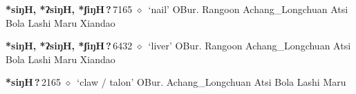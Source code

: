   \begin{list}{}{\leftmargin=1.5em \itemindent=-1.5em}
  \item {\footnotesize \textbf{*siŋH, *ʔsiŋH, *ʃiŋH\,?\,}}{\tiny 7165}
         $\diamond$~`nail'
         OBur. 
\hspace{1ex}
         Rangoon 
\hspace{1ex}
         Achang\_Longchuan 
\hspace{1ex}
         Atsi 
\hspace{1ex}
         Bola 
\hspace{1ex}
         Lashi 
\hspace{1ex}
         Maru 
\hspace{1ex}
         Xiandao 
  \item {\footnotesize \textbf{*siŋH, *ʔsiŋH, *ʃiŋH\,?\,}}{\tiny 6432}
\hspace{1ex}
         $\diamond$~`liver'
         OBur. 
\hspace{1ex}
         Rangoon 
\hspace{1ex}
         Achang\_Longchuan 
\hspace{1ex}
         Atsi 
\hspace{1ex}
         Bola 
\hspace{1ex}
         Lashi 
\hspace{1ex}
         Maru 
\hspace{1ex}
         Xiandao 
  \item {\footnotesize \textbf{*siŋH\,?\,}}{\tiny 2165}
\hspace{1ex}
         $\diamond$~`claw / talon'
         OBur. 
\hspace{1ex}
         Achang\_Longchuan 
\hspace{1ex}
         Atsi 
\hspace{1ex}
         Bola 
\hspace{1ex}
         Lashi 
\hspace{1ex}
         Maru 
  \end{list}
